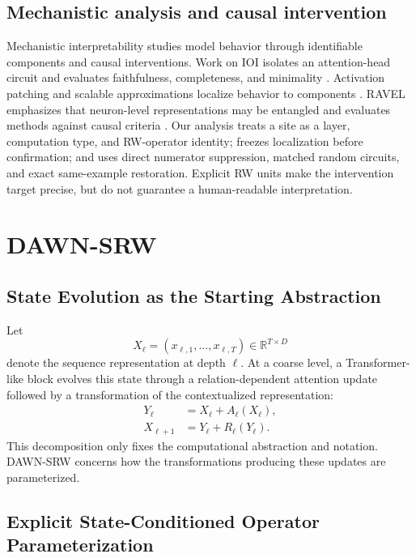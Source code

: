 \documentclass{article}
\newcommand{\R}{\mathbb{R}}
\newcommand{\DAWN}{DAWN-SRW}
\begin{document}
\subsection{Mechanistic analysis and causal intervention}

Mechanistic interpretability studies model behavior through identifiable
components and causal interventions. Work on IOI isolates an attention-head
circuit and evaluates faithfulness, completeness, and minimality
\cite{wang2023interpretability}. Activation patching and scalable
approximations localize behavior to components \cite{kramar2024atp}. RAVEL
emphasizes that neuron-level representations may be entangled and evaluates
methods against causal criteria \cite{huang2024ravel}. Our analysis treats a
site as a layer, computation type, and RW-operator identity; freezes
localization before confirmation; and uses direct numerator suppression,
matched random circuits, and exact same-example restoration. Explicit RW units
make the intervention target precise, but do not guarantee a human-readable
interpretation.

\section{DAWN-SRW}
\label{sec:method}

\subsection{State Evolution as the Starting Abstraction}
\label{sec:state-evolution}

Let
\[
X_\ell=(x_{\ell,1},\ldots,x_{\ell,T})\in\R^{T\times D}
\]
denote the sequence representation at depth \(\ell\). At a coarse level, a
Transformer-like block evolves this state through a relation-dependent
attention update followed by a transformation of the contextualized
representation:
\begin{align}
Y_\ell&=X_\ell+A_\ell(X_\ell),\\
X_{\ell+1}&=Y_\ell+R_\ell(Y_\ell).
\label{eq:state_evolution}
\end{align}
This decomposition only fixes the computational abstraction and notation.
\DAWN{} concerns how the transformations producing these updates are
parameterized.

\subsection{Explicit State-Conditioned Operator Parameterization}
\label{sec:transition-hypothesis}
\end{document}
